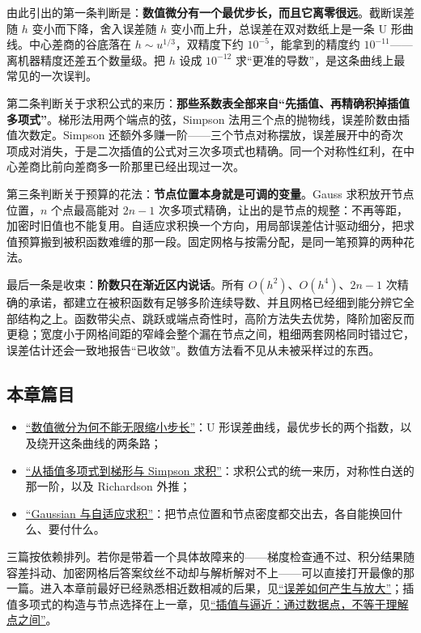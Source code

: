 由此引出的第一条判断是：\textbf{数值微分有一个最优步长，而且它离零很远}。截断误差随 \(h\) 变小而下降，舍入误差随 \(h\) 变小而上升，总误差在双对数纸上是一条 U 形曲线。中心差商的谷底落在 \(h\sim u^{1/3}\)，双精度下约 \(10^{-5}\)，能拿到的精度约 \(10^{-11}\)——离机器精度还差五个数量级。把 \(h\) 设成 \(10^{-12}\) 求``更准的导数''，是这条曲线上最常见的一次误判。

第二条判断关于求积公式的来历：\textbf{那些系数表全部来自``先插值、再精确积掉插值多项式''}。梯形法用两个端点的弦，Simpson 法用三个点的抛物线，误差阶数由插值次数定。Simpson 还额外多赚一阶——三个节点对称摆放，误差展开中的奇次项成对消失，于是二次插值的公式对三次多项式也精确。同一个对称性红利，在中心差商比前向差商多一阶那里已经出现过一次。

第三条判断关于预算的花法：\textbf{节点位置本身就是可调的变量}。Gauss 求积放开节点位置，\(n\) 个点最高能对 \(2n-1\) 次多项式精确，让出的是节点的规整：不再等距，加密时旧值也不能复用。自适应求积换一个方向，用局部误差估计驱动细分，把求值预算搬到被积函数难缠的那一段。固定网格与按需分配，是同一笔预算的两种花法。

最后一条是收束：\textbf{阶数只在渐近区内说话}。所有 \(O(h^2)\)、\(O(h^4)\)、\(2n-1\) 次精确的承诺，都建立在被积函数有足够多阶连续导数、并且网格已经细到能分辨它全部结构之上。函数带尖点、跳跃或端点奇性时，高阶方法失去优势，降阶加密反而更稳；宽度小于网格间距的窄峰会整个漏在节点之间，粗细两套网格同时错过它，误差估计还会一致地报告``已收敛''。数值方法看不见从未被采样过的东西。

\subsection{本章篇目}

\begin{itemize}
\tightlist
\item \hyperref[sec:08-Numerical-Analysis/04-Numerical-Differentiation-and-Integration/01]{``数值微分为何不能无限缩小步长''}：U 形误差曲线，最优步长的两个指数，以及绕开这条曲线的两条路；
\item \hyperref[sec:08-Numerical-Analysis/04-Numerical-Differentiation-and-Integration/02]{``从插值多项式到梯形与 Simpson 求积''}：求积公式的统一来历，对称性白送的那一阶，以及 Richardson 外推；
\item \hyperref[sec:08-Numerical-Analysis/04-Numerical-Differentiation-and-Integration/03]{``Gaussian 与自适应求积''}：把节点位置和节点密度都交出去，各自能换回什么、要付什么。
\end{itemize}

三篇按依赖排列。若你是带着一个具体故障来的——梯度检查通不过、积分结果随容差抖动、加密网格后答案纹丝不动却与解析解对不上——可以直接打开最像的那一篇。进入本章前最好已经熟悉相近数相减的后果，见\hyperref[sec:08-Numerical-Analysis/01-Floating-Point-and-Error/02]{``误差如何产生与放大''}；插值多项式的构造与节点选择在上一章，见\hyperref[ch:063]{``插值与逼近：通过数据点，不等于理解点之间''}。
